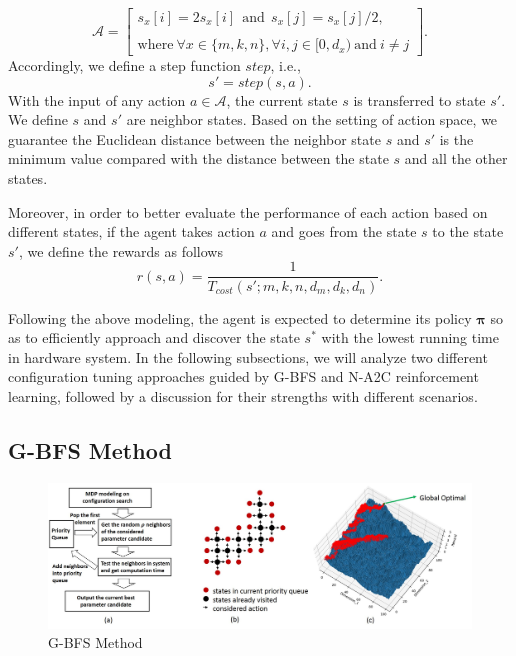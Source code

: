 \begin{equation}
    \mathcal{A} = \left[ \begin{array}{l}
         {s_x[i] = 2s_x[i] ~~\text{and}~~ s_x[j]=s_x[j]/2 }, \\ \\
         {\text{where}~ \forall x \in \{m,k,n\}, \forall i, j \in [0, d_x)~\text{and}~ i \neq j }
    \end{array}
     \right].
\end{equation}
Accordingly, we define a step function $step$, i.e.,
\begin{equation}\label{fun:stepfun}
    s'= step(s,a).
\end{equation}
With the input of any action $a \in \mathcal{A}$, the current state $s$ is transferred to state $s'$. We define $s$ and $s'$ are neighbor states. Based on the setting of action space, we guarantee the Euclidean distance between the neighbor state $s$ and $s'$ is the minimum value compared with the distance between the state $s$ and all the other states.

Moreover, in order to better evaluate the performance of each action based on different states, if the agent takes action $a$ and goes from the state $s$ to the state $s'$, we define the rewards as follows
\begin{equation}
    r(s,a) = \frac{1}{T_{cost}(s'; m,k,n,d_m,d_k,d_n) }.
\end{equation}

Following the above modeling, the agent is expected to determine its policy $\boldsymbol{\pi}$ so as to efficiently approach and discover the state $s^*$ with the lowest running time in hardware system. In the following subsections, we will analyze two different configuration tuning approaches guided by G-BFS and N-A2C reinforcement learning, followed by a discussion for their strengths with different scenarios.



\subsection{G-BFS Method}

\begin{figure}
\centering
\includegraphics[scale=0.4]{4_Method/gbfs_pic.jpg}
\caption{G-BFS Method}
\label{fig:gbfs}
\end{figure}

